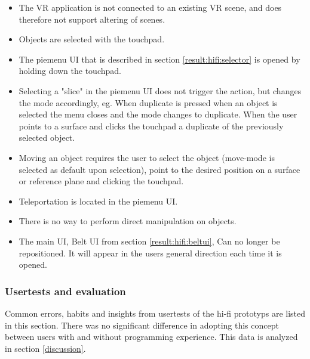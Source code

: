 \begin{itemize}
  \item The VR application is not connected to an existing VR scene, and does therefore not support altering of scenes.
  \item Objects are selected with the touchpad.
  \item The piemenu UI that is described in section \ref{result:hifi:selector} is opened by holding down the touchpad.
  \item Selecting a "slice" in the piemenu UI does not trigger the action, but changes the mode accordingly, eg. When duplicate is pressed when an object is selected the menu closes and the mode changes to duplicate. When the user points to a surface and clicks the touchpad a duplicate of the previously selected object.
  \item Moving an object requires the user to select the object (move-mode is selected as default upon selection), point to the desired position on a surface or reference plane and clicking the touchpad.
  \item Teleportation is located in the piemenu UI.
  \item There is no way to perform direct manipulation on objects.
  \item The main UI, Belt UI from section \ref{result:hifi:beltui}, Can no longer be repositioned. It will appear in the users general direction each time it is opened.

\end{itemize}

\subsubsection{Usertests and evaluation}
Common errors, habits and insights from usertests of the hi-fi prototyps are listed in this section. There was no significant difference in adopting this concept between users with and without programming experience.
This data is analyzed in section \ref{discussion}.

